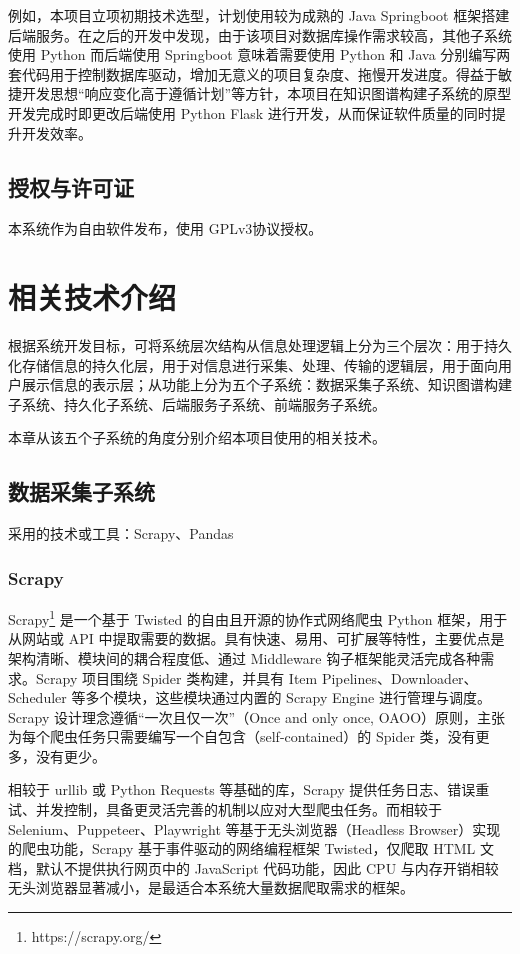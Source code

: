 \documentclass[a4paper,AutoFakeBold,oneside,12pt]{book}
\begin{document}
例如，本项目立项初期技术选型，计划使用较为成熟的 Java Springboot 框架搭建后端服务。在之后的开发中发现，由于该项目对数据库操作需求较高，其他子系统使用 Python 而后端使用 Springboot 意味着需要使用 Python 和 Java 分别编写两套代码用于控制数据库驱动，增加无意义的项目复杂度、拖慢开发进度。得益于敏捷开发思想“响应变化高于遵循计划”等方针，本项目在知识图谱构建子系统的原型开发完成时即更改后端使用 Python Flask 进行开发，从而保证软件质量的同时提升开发效率。

\section{授权与许可证}

本系统作为自由软件\cite{libre_software}发布，使用 GPLv3\cite{gpl_v3}协议授权。

\chapter{相关技术介绍}

根据系统开发目标，可将系统层次结构从信息处理逻辑上分为三个层次：用于持久化存储信息的持久化层，用于对信息进行采集、处理、传输的逻辑层，用于面向用户展示信息的表示层；从功能上分为五个子系统：数据采集子系统、知识图谱构建子系统、持久化子系统、后端服务子系统、前端服务子系统。

本章从该五个子系统的角度分别介绍本项目使用的相关技术。

\section{数据采集子系统}

采用的技术或工具：Scrapy、Pandas

\subsection{Scrapy}

Scrapy\footnote{https://scrapy.org/} 是一个基于 Twisted 的自由且开源的协作式网络爬虫 Python 框架，用于从网站或 API 中提取需要的数据。具有快速、易用、可扩展等特性，主要优点是架构清晰、模块间的耦合程度低、通过 Middleware 钩子框架能灵活完成各种需求。Scrapy 项目围绕 Spider 类构建，并具有 Item Pipelines、Downloader、Scheduler 等多个模块，这些模块通过内置的 Scrapy Engine 进行管理与调度。Scrapy 设计理念遵循“一次且仅一次”（Once and only once, OAOO）原则，主张为每个爬虫任务只需要编写一个自包含（self-contained）的 Spider 类，没有更多，没有更少。

相较于 urllib 或 Python Requests 等基础的库，Scrapy 提供任务日志、错误重试、并发控制，具备更灵活完善的机制以应对大型爬虫任务。而相较于 Selenium、Puppeteer、Playwright 等基于无头浏览器（Headless Browser）实现的爬虫功能，Scrapy 基于事件驱动的网络编程框架 Twisted，仅爬取 HTML 文档，默认不提供执行网页中的 JavaScript 代码功能，因此 CPU 与内存开销相较无头浏览器显著减小，是最适合本系统大量数据爬取需求的框架。
\end{document}
